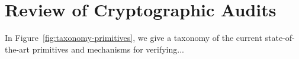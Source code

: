 \section{Review of Cryptographic Audits} \label{sect:techniques}

In Figure~\ref{fig:taxonomy-primitives}, we give a taxonomy of the current state-of-the-art primitives and mechanisms for verifying...


